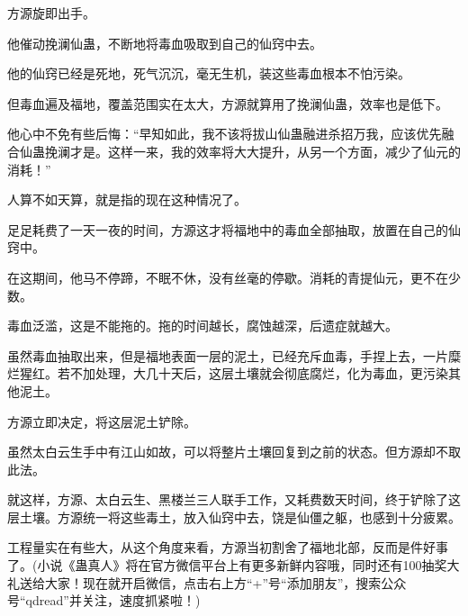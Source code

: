 \begin{this_body}
方源旋即出手。

他催动挽澜仙蛊，不断地将毒血吸取到自己的仙窍中去。

他的仙窍已经是死地，死气沉沉，毫无生机，装这些毒血根本不怕污染。

但毒血遍及福地，覆盖范围实在太大，方源就算用了挽澜仙蛊，效率也是低下。

他心中不免有些后悔：“早知如此，我不该将拔山仙蛊融进杀招万我，应该优先融合仙蛊挽澜才是。这样一来，我的效率将大大提升，从另一个方面，减少了仙元的消耗！”

人算不如天算，就是指的现在这种情况了。

足足耗费了一天一夜的时间，方源这才将福地中的毒血全部抽取，放置在自己的仙窍中。

在这期间，他马不停蹄，不眠不休，没有丝毫的停歇。消耗的青提仙元，更不在少数。

毒血泛滥，这是不能拖的。拖的时间越长，腐蚀越深，后遗症就越大。

虽然毒血抽取出来，但是福地表面一层的泥土，已经充斥血毒，手捏上去，一片糜烂猩红。若不加处理，大几十天后，这层土壤就会彻底腐烂，化为毒血，更污染其他泥土。

方源立即决定，将这层泥土铲除。

虽然太白云生手中有江山如故，可以将整片土壤回复到之前的状态。但方源却不取此法。

就这样，方源、太白云生、黑楼兰三人联手工作，又耗费数天时间，终于铲除了这层土壤。方源统一将这些毒土，放入仙窍中去，饶是仙僵之躯，也感到十分疲累。

工程量实在有些大，从这个角度来看，方源当初割舍了福地北部，反而是件好事了。(小说《蛊真人》将在官方微信平台上有更多新鲜内容哦，同时还有100抽奖大礼送给大家！现在就开启微信，点击右上方“+”号“添加朋友”，搜索公众号“qdread”并关注，速度抓紧啦！)

\end{this_body}

